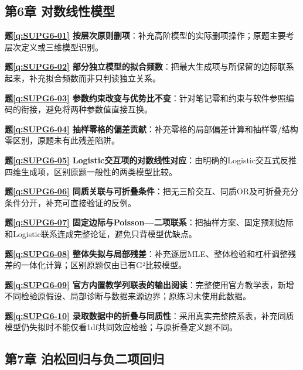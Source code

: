 \subsection*{第6章 对数线性模型}

\noindent\textbf{题\ref*{q:SUPG6-01} 按层次原则删项}：补充高阶模型的实际删项操作；原题主要考层次定义或三维模型识别。\par

\noindent\textbf{题\ref*{q:SUPG6-02} 部分独立模型的拟合频数}：把最大生成项与所保留的边际联系起来，补充拟合频数而非只判读独立关系。\par

\noindent\textbf{题\ref*{q:SUPG6-03} 参数约束改变与优势比不变}：针对笔记零和约束与软件参照编码的衔接，避免将两种参数值直接互换。\par

\noindent\textbf{题\ref*{q:SUPG6-04} 抽样零格的偏差贡献}：补充零格的局部偏差计算和抽样零/结构零区别，原题未有此残差陷阱。\par

\noindent\textbf{题\ref*{q:SUPG6-05} Logistic交互项的对数线性对应}：由明确的Logistic交互式反推四维生成项，区别原题一般性的两类模型比较。\par

\noindent\textbf{题\ref*{q:SUPG6-06} 同质关联与可折叠条件}：把无三阶交互、同质OR及可折叠充分条件分开，补充可直接验证的反例。\par

\noindent\textbf{题\ref*{q:SUPG6-07} 固定边际与Poisson—二项联系}：把抽样方案、固定预测边际和Logistic联系连成完整论证，避免只背模型优缺点。\par

\noindent\textbf{题\ref*{q:SUPG6-08} 整体失拟与局部残差}：补充逐层MLE、整体检验和杠杆调整残差的一体化计算；区别原题仅由已有G²比较模型。\par

\noindent\textbf{题\ref*{q:SUPG6-09} 官方内置教学列联表的输出阅读}：完整使用官方教学表，新增不同检验原假设、局部诊断与数据来源边界；原练习未使用此数据。\par

\noindent\textbf{题\ref*{q:SUPG6-10} 录取数据中的折叠与同质性}：采用真实完整院系表，补充同质模型仍失拟时不能仅看1df共同效应检验；与原折叠定义题不同。\par

\subsection*{第7章 泊松回归与负二项回归}

